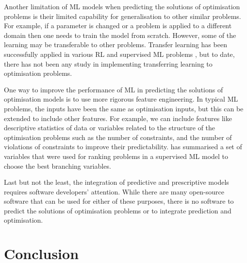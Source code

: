 \documentclass[graybox]{svmult}
\begin{document}
Another limitation of ML models when predicting the solutions of optimisation problems is their limited capability for generalisation to other similar problems. For example, if a parameter is changed or a problem is applied to a different domain then one needs to train the model from scratch. However, some of the learning may be transferable to other problems. Transfer learning has been successfully applied in various RL and supervised ML problems \cite{brys2015policy}, but to date, there has not been any study in implementing transferring learning to optimisation problems. 

One way to improve the performance of ML in predicting the solutions of optimisation models is to use more rigorous feature engineering. In typical ML problems, the inputs have been the same as optimisation inputs, but this can be extended to include other features. For example, we can include features like descriptive statistics of data or variables related to the structure of the optimisation problems such as the number of constraints, and the number of violations of constraints to improve their predictability. \citet{Khalil_undated-qm} has summarised a set of variables that were used for ranking problems in a supervised ML model to choose the best branching variables. 

Last but not the least, the integration of predictive and prescriptive models requires software developers' attention. While there are many open-source software that can be used for either of these purposes, there is no software to predict the solutions of optimisation problems or to integrate prediction and optimisation.



\section{Conclusion}\label{sec:conclusion}
\end{document}
